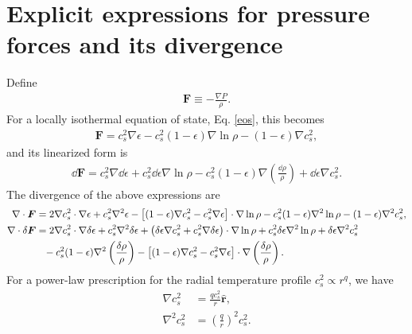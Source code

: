 
\section{Explicit expressions for pressure forces and its divergence}
Define
\begin{align}
  \bm{F} \equiv - \frac{\nabla P}{\rho}. 
\end{align}
For a locally isothermal equation of state, Eq. \ref{eos}, this
becomes
\begin{align}
  \bm{F} = c_s^2\nabla \epsilon - c_s^2(1-\epsilon)\nabla\ln{\rho} -
  (1-\epsilon)\nabla c_s^2,
\end{align} 
and its linearized form is
\begin{align}
  \dd\bm{F} = c_s^2\nabla\dd\epsilon + c_s^2\dd\epsilon\nabla\ln{\rho}
  - c_s^2(1-\epsilon)\nabla\left(\frac{\dd\rho}{\rho}\right) +
  \dd\epsilon\nabla c_s^2. 
\end{align}
The divergence of the above expressions are
\begin{align}
  \nabla\cdot\bm{F} &= 2 \nabla c_s^2\cdot\nabla\epsilon +
  c_s^2\nabla^2\epsilon  - \left[(1-\epsilon)\nabla c_s^2 -
    c_s^2\nabla\epsilon\right]\cdot\nabla\ln{\rho}
 - c_s^2(1-\epsilon)\nabla^2\ln{\rho} - (1-\epsilon)\nabla^2 c_s^2,\\
 \nabla\cdot\delta\bm{F} &= 2\nabla c_s^2\cdot\nabla\delta\epsilon +
 c_s^2\nabla^2\delta\epsilon + \left(\delta\epsilon \nabla c_s^2 +
 c_s^2\nabla\delta\epsilon\right)\cdot\nabla\ln{\rho} + c_s^2 \delta\epsilon
 \nabla^2\ln{\rho}   + \delta\epsilon\nabla^2 c_s^2 \notag\\
&\phantom{=}-c_s^2(1-\epsilon)\nabla^2\left(\frac{\delta\rho}{\rho}\right) - \left[(1-\epsilon)\nabla c_s^2 -
    c_s^2\nabla\epsilon\right]\cdot\nabla \left(\frac{\delta\rho}{\rho}\right).
\end{align}
For a power-law prescription for the radial temperature
profile $c_s^2\propto r^q$, we have
\begin{align}
  \nabla c_s^2 &= \frac{qc_s^2}{r}\hat{\bm{r}},\\
  \nabla^2 c_s^2 & = \left(\frac{q}{r}\right)^2 c_s^2. 
\end{align}



